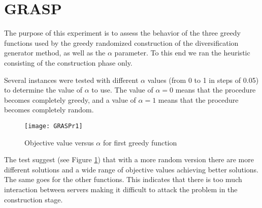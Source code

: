 \section{GRASP}
The purpose of this experiment
is to assess the behavior of the three greedy functions
used by the greedy randomized construction
of the diversification generator method,
as well as the $\alpha$ parameter.
To this end
we ran the heuristic consisting of
the construction phase only.

Several instances were tested
with different $\alpha$ values
(from 0 to 1 in steps of 0.05)
to determine the value of $\alpha$ to use.
The value of $\alpha = 0$ means that
the procedure becomes completely greedy,
and a value of $\alpha = 1$ means that
the procedure becomes completely random.
\begin{figure}[!ht]
  \centering
  \label{fig:grasp-results}
  \texttt{[image: GRASPr1]}
  \caption{Objective value versus $\alpha$ for first greedy function}
\end{figure}
The test suggest
(see Figure \ref{fig:grasp-results})
that
with a more random version
there are more different solutions
and a wide range of objective values
achieving better solutions.
The same goes for the other functions.
This indicates
that there is too much interaction between servers
making it difficult to attack the problem
in the construction stage.
